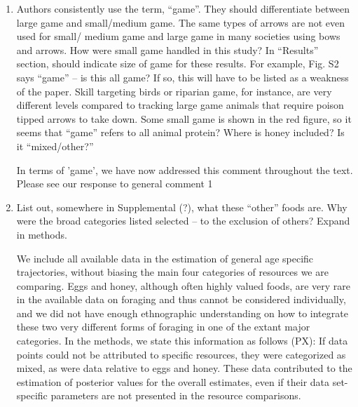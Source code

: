 \documentclass{article}
\newcommand{\rev}[1]{{\color{ForestGreen}#1}}
\begin{document}
\begin{enumerate}
    \item Authors consistently use the term, “game”. They should differentiate between large game and small/medium game. The same types of arrows are not even used for small/ medium game and large game in many societies using bows and arrows. How were small game handled in this study? In “Results” section, should indicate size of game for these results. For example, Fig. S2 says “game” – is this all game? If so, this will have to be listed as a weakness of the paper. Skill targeting birds or riparian game, for instance, are very different levels compared to tracking large game animals that require poison tipped arrows to take down. Some small game is shown in the red figure, so it seems that “game” refers to all animal protein? Where is honey included? Is it ``mixed/other?”

\rev{In terms of 'game', we have now addressed this comment throughout the text. Please see our response to general comment 1}

    \item List out, somewhere in Supplemental (?), what these ``other” foods are. Why were the broad categories listed selected – to the exclusion of others? Expand in methods.
    
\rev{We include all available data in the estimation of general age specific trajectories, without biasing the main four categories of resources we are comparing. Eggs and honey, although often highly valued foods, are very rare in the available data on foraging and thus cannot be considered individually, and we did not have enough ethnographic understanding on how to integrate these two very different forms of foraging in one of the extant major categories. In the methods, we state this information as follows (PX):
If data points could not be attributed to specific resources, they were categorized as mixed, as were data relative to eggs and honey. These data contributed to the estimation of posterior values for the overall estimates, even if their data set-specific parameters are not presented in the resource comparisons.}


\end{enumerate}
\end{document}
